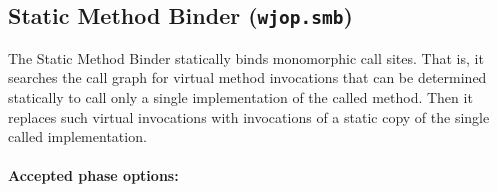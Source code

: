 \documentclass{article}
\begin{document}
\subsection{Static Method Binder ({\tt wjop.smb})}

The Static Method Binder statically binds monomorphic call
sites. That is, it searches the call graph for virtual method
invocations that can be determined statically to call only a single
implementation of the called method.  Then it replaces such virtual
invocations with invocations of a static copy of the single called
implementation.


\paragraph{Accepted phase options:} 
\end{document}
